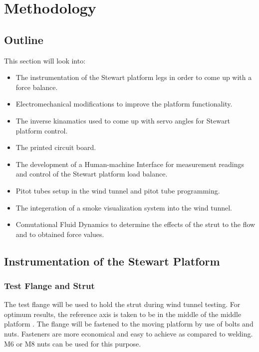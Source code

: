 \section{Methodology}
\subsection{Outline}
This section will look into:
\begin{itemize}
	\item The instrumentation of the Stewart platform legs in order to come up with a force balance.
	\item Electromechanical modifications to improve the platform functionality.
	\item The inverse kinamatics used to come up with servo angles for Stewart platform control.
	\item The printed circuit board.
	\item The development of a Human-machine
	 Interface for measurement readings and control of the Stewart platform load balance.
	\item Pitot tubes setup in the wind tunnel and pitot tube programming.
	\item The integeration of a smoke visualization system into the wind tunnel.
	\item Comutational Fluid Dynamics to determine the effects of the strut to the flow and to obtained 
		force values.
\end{itemize}

\subsection{Instrumentation of the Stewart Platform}

\subsubsection{Test Flange and Strut}
The test flange will be used to hold the strut during wind tunnel testing. For optimum results, the reference axis is taken to be in the middle of the middle platform \cite {fernandes_design_nodate}. The flange will be fastened to the moving platform by use of bolts and nuts. Fasteners are more economical and easy to achieve as compared to welding. M6 or M8 nuts can be used for this purpose.

